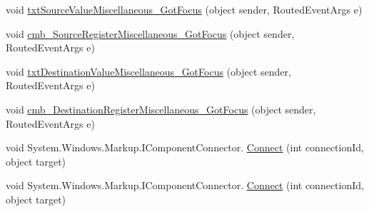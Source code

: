 \begin{DoxyCompactItemize}
\item 
void \hyperlink{class_c_p_u___o_s___simulator_1_1_instructions_window_ae5a577d3fa0f6abeb8239de87a4c4a48}{txt\+Source\+Value\+Miscellaneous\+\_\+\+Got\+Focus} (object sender, Routed\+Event\+Args e)
\item 
void \hyperlink{class_c_p_u___o_s___simulator_1_1_instructions_window_aebeed4545e10bda489f1f73f4c09a20c}{cmb\+\_\+\+Source\+Register\+Miscellaneous\+\_\+\+Got\+Focus} (object sender, Routed\+Event\+Args e)
\item 
void \hyperlink{class_c_p_u___o_s___simulator_1_1_instructions_window_aceca94bcec64cbfd4cfe472e9dd34a58}{txt\+Destination\+Value\+Miscellaneous\+\_\+\+Got\+Focus} (object sender, Routed\+Event\+Args e)
\item 
void \hyperlink{class_c_p_u___o_s___simulator_1_1_instructions_window_aa05471f59f3884c72353dd2fd41fbabf}{cmb\+\_\+\+Destination\+Register\+Miscellaneous\+\_\+\+Got\+Focus} (object sender, Routed\+Event\+Args e)
\item 
void System.\+Windows.\+Markup.\+I\+Component\+Connector. \hyperlink{class_c_p_u___o_s___simulator_1_1_instructions_window_a0efa7624a59a6abc64d0940ffaa100b0}{Connect} (int connection\+Id, object target)
\item 
void System.\+Windows.\+Markup.\+I\+Component\+Connector. \hyperlink{class_c_p_u___o_s___simulator_1_1_instructions_window_a0efa7624a59a6abc64d0940ffaa100b0}{Connect} (int connection\+Id, object target)
\end{DoxyCompactItemize}
